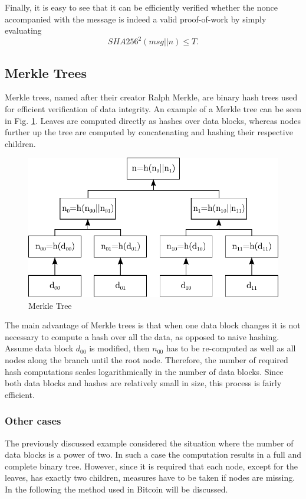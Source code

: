 \noindent
Finally, it is easy to see that it can be efficiently verified whether the nonce accompanied with the message is indeed a valid proof-of-work by simply evaluating
\begin{equation}
SHA256^{2}(msg||n) \leq T.
\end{equation}


\subsection{Merkle Trees} \label{sec:MerkleTrees}
Merkle trees, named after their creator Ralph Merkle, are binary hash trees used for efficient verification of data integrity. An example of a Merkle tree can be seen in Fig. \ref{fig:MerkleTree}. Leaves are computed directly as hashes over data blocks, whereas nodes further up the tree are computed by concatenating and hashing their respective children.

\begin{figure}[htbp]
 \centering
 \includegraphics[scale=0.75]{images/MerkleTree.pdf}
 \caption{Merkle Tree}
 \label{fig:MerkleTree}
\end{figure}
\vspace{-10pt}

\noindent
The main advantage of Merkle trees is that when one data block changes it is not necessary to compute a hash over all the data, as opposed to naive hashing. Assume data block $\mathit{d_{00}}$ is modified, then $\mathit{n_{00}}$ has to be re-computed as well as all nodes along the branch until the root node. Therefore, the number of required hash computations scales logarithmically in the number of data blocks. Since both data blocks and hashes are relatively small in size, this process is fairly efficient.

\subsubsection*{Other cases}
The previously discussed example considered the situation where the number of data blocks is a power of two. In such a case the computation results in a full and complete binary tree. However, since it is required that each node, except for the leaves, has exactly two children, measures have to be taken if nodes are missing. In the following the method used in Bitcoin will be discussed.

